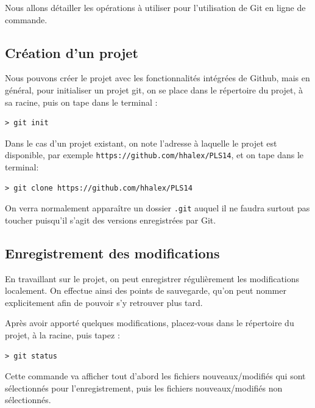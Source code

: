 \par Nous allons détailler les opérations à utiliser pour l'utilisation de Git en ligne de commande. 

\subsection{Création d'un projet}
\label{sec:creation-dun-projet}

\par Nous pouvons créer le projet avec les fonctionnalités intégrées de Github, mais en général, pour initialiser un projet git, on se place dans le répertoire du projet, à sa racine, puis on tape dans le terminal :
\begin{verbatim}
> git init
\end{verbatim}

\par Dans le cas d'un projet existant, on note l'adresse à laquelle le projet est disponible, par exemple \texttt{https://github.com/hhalex/PLS14}, et on tape dans le terminal:
\begin{verbatim}
> git clone https://github.com/hhalex/PLS14
\end{verbatim}

\par On verra normalement apparaître un dossier \texttt{.git} auquel il ne faudra surtout pas toucher puisqu'il s'agit des versions enregistrées par Git.

\subsection{Enregistrement des modifications}
\label{sec:enreg-des-modif}

\par En travaillant sur le projet, on peut enregistrer régulièrement les modifications localement. On effectue ainsi des points de sauvegarde, qu'on peut nommer explicitement afin de pouvoir s'y retrouver plus tard.
\par Après avoir apporté quelques modifications, placez-vous dans le répertoire du projet, à la racine, puis tapez :
\begin{verbatim}
> git status
\end{verbatim}
\par Cette commande va afficher tout d'abord les fichiers nouveaux/modifiés qui sont sélectionnés pour l'enregistrement, puis les fichiers nouveaux/modifiés non sélectionnés. 

